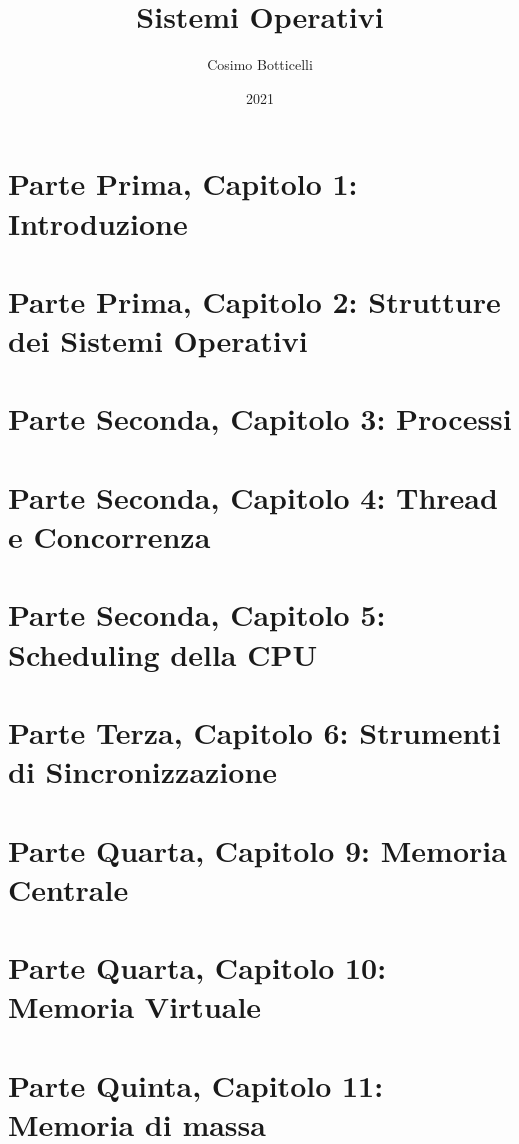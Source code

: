 \documentclass[12pt]{report}
\title{Sistemi Operativi}
\author{Cosimo Botticelli}
\date{2021}
\begin{document}
\maketitle
\tableofcontents


\chapter{Parte Prima, Capitolo 1: Introduzione}



\chapter{Parte Prima, Capitolo 2: Strutture dei Sistemi Operativi}


\chapter{Parte Seconda, Capitolo 3: Processi}


\chapter{Parte Seconda, Capitolo 4: Thread e Concorrenza}


\chapter{Parte Seconda, Capitolo 5: Scheduling della CPU}


\chapter{Parte Terza, Capitolo 6: Strumenti di Sincronizzazione}


\chapter{Parte Quarta, Capitolo 9: Memoria Centrale}


\chapter{Parte Quarta, Capitolo 10: Memoria Virtuale}


\chapter{Parte Quinta, Capitolo 11: Memoria di massa}

\end{document}
